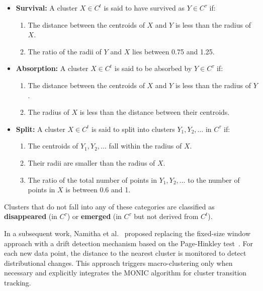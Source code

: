 \begin{itemize}
    \item \textbf{Survival:} A cluster $ X \in C^t $ is said to have survived as $ Y \in C^\tau $ if:
          \begin{enumerate}
              \item The distance between the centroids of $ X $ and $ Y $ is less than the radius
                    of $ X $.
              \item The ratio of the radii of $ Y $ and $ X $ lies between 0.75 and 1.25.
          \end{enumerate}

    \item \textbf{Absorption:} A cluster $ X \in C^t $ is said to be absorbed by $ Y \in C^\tau $ if:
          \begin{enumerate}
              \item The distance between the centroids of $ X $ and $ Y $ is less than the radius
                    of $ Y $.
              \item The radius of $ X $ is less than the distance between their centroids.
          \end{enumerate}

    \item \textbf{Split:} A cluster $ X \in C^t $ is said to split into clusters $ Y_1, Y_2, \dots $ in $ C^\tau $ if:
          \begin{enumerate}
              \item The centroids of $ Y_1, Y_2, \dots $ fall within the radius of $ X $.
              \item Their radii are smaller than the radius of $ X $.
              \item The ratio of the total number of points in $ Y_1, Y_2, \dots $ to the number of
                    points in $ X $ is between 0.6 and 1.
          \end{enumerate}
\end{itemize}

Clusters that do not fall into any of these categories are classified as
\textbf{disappeared} (in $ C^\tau $) or \textbf{emerged} (in $ C^\tau $ but not
derived from $ C^t $).

In a subsequent work, Namitha et al.~\cite{namitha_dynamic_clustering_2}
proposed replacing the fixed-size window approach with a drift detection
mechanism based on the Page-Hinkley test~\cite{page_hinkley}. For each new data
point, the distance to the nearest cluster is monitored to detect
distributional changes. This approach triggers macro-clustering only when
necessary and explicitly integrates the MONIC algorithm for cluster transition
tracking.


